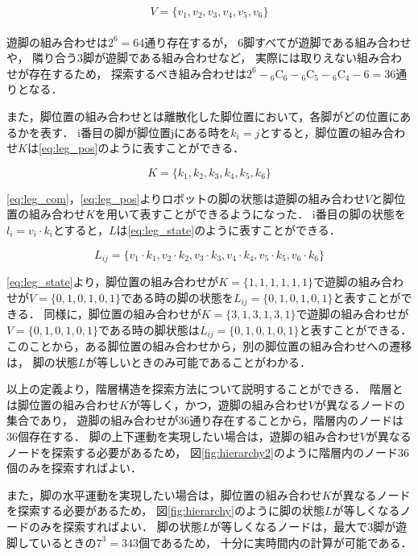 \begin{equation}\label{eq:leg_com}
  V = \{v_1, v_2, v_3, v_4, v_5, v_6\}
\end{equation}
\\
遊脚の組み合わせは$2^6 = 64$通り存在するが，
6脚すべてが遊脚である組み合わせや，
隣り合う3脚が遊脚である組み合わせなど，
実際には取りえない組み合わせが存在するため，
探索するべき組み合わせは$2^6 - {}_6 \mathrm{C}_6 - {}_6 \mathrm{C}_5 - {}_6 \mathrm{C}_4 - 6 = 36$通りとなる．

また，脚位置の組み合わせとは離散化した脚位置において，各脚がどの位置にあるかを表す．
i番目の脚が脚位置jにある時を$k_i = j$とすると，脚位置の組み合わせ$K$は\eqref{eq:leg_pos}のように表すことができる．

\begin{equation}\label{eq:leg_pos}
  K = \{k_1, k_2, k_3, k_4, k_5, k_6\}
\end{equation}

\noindent\eqref{eq:leg_com}，\eqref{eq:leg_pos}よりロボットの脚の状態は遊脚の組み合わせ$V$と脚位置の組み合わせ$K$を用いて表すことができるようになった．
i番目の脚の状態を$l_i = v_i \cdot k_i$とすると，$L$は\eqref{eq:leg_state}のように表すことができる．

\begin{equation}\label{eq:leg_state}
  L_{ij} = \{v_1 \cdot k_1, v_2 \cdot k_2, v_3 \cdot k_3, v_4 \cdot k_4, v_5 \cdot k_5, v_6 \cdot k_6\}
\end{equation}

\noindent\eqref{eq:leg_state}より，脚位置の組み合わせが$K = \{1,1,1,1,1,1\}$で遊脚の組み合わせが$V = \{0,1,0,1,0,1\}$である時の脚の状態を$L_{ij} = \{0,1,0,1,0,1\}$と表すことができる．
同様に，脚位置の組み合わせが$K = \{3,1,3,1,3,1\}$で遊脚の組み合わせが$V = \{0,1,0,1,0,1\}$である時の脚状態は$L_{ij} = \{0,1,0,1,0,1\}$と表すことができる．
このことから，ある脚位置の組み合わせから，別の脚位置の組み合わせへの遷移は，
脚の状態$L$が等しいときのみ可能であることがわかる．

以上の定義より，階層構造を探索方法について説明することができる．
階層とは脚位置の組み合わせ$K$が等しく，かつ，遊脚の組み合わせ$V$が異なるノードの集合であり，
遊脚の組み合わせが36通り存在することから，階層内のノードは36個存在する．
脚の上下運動を実現したい場合は，遊脚の組み合わせ$V$が異なるノードを探索する必要があるため，
図\ref{fig:hierarchy2}のように階層内のノード36個のみを探索すればよい．

また，脚の水平運動を実現したい場合は，脚位置の組み合わせ$K$が異なるノードを探索する必要があるため，
図\ref{fig:hierarchy}のように脚の状態$L$が等しくなるノードのみを探索すればよい．
脚の状態$L$が等しくなるノードは，最大で3脚が遊脚しているときの$7^3 = 343$個であるため，
十分に実時間内の計算が可能である．

